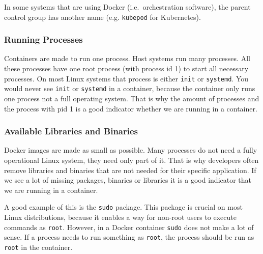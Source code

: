 \hfill

In some systems that are using Docker (i.e.\ orchestration software), the parent control group has another name (e.g. \lstinline{kubepod} for Kubernetes).

\subsubsection{Running Processes}
Containers are made to run one process. Host systems run many processes. All these processes have one root process (with process id 1) to start all necessary processes. On most Linux systems that process is either \lstinline{init} or \lstinline{systemd}. You would never see \lstinline{init} or \lstinline{systemd} in a container, because the container only runs one process not a full operating system. That is why the amount of processes and the process with pid 1 is a good indicator whether we are running in a container.

\subsubsection{Available Libraries and Binaries}
Docker images are made as small as possible. Many processes do not need a fully operational Linux system, they need only part of it. That is why developers often remove libraries and binaries that are not needed for their specific application. If we see a lot of missing packages, binaries or libraries it is a good indicator that we are running in a container.

A good example of this is the \lstinline{sudo} package. This package is crucial on most Linux distributions, because it enables a way for non-root users to execute commands as \lstinline{root}. However, in a Docker container \lstinline{sudo} does not make a lot of sense. If a process needs to run something as \lstinline{root}, the process should be run as \lstinline{root} in the container.
